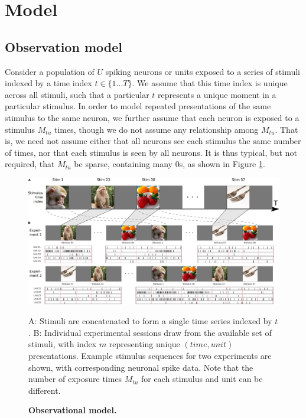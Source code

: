 \documentclass[12pt,a4paper]{article}
\begin{document}
\section*{Model}
\label{model_sec}

\subsection*{Observation model}
Consider a population of $U$ spiking neurons or units exposed to a series of stimuli indexed by a time index $t\in \lbrace 1\ldots T\rbrace$. We assume that this time index is unique across all stimuli, such that a particular $t$ represents a unique moment in a particular stimulus. In order to model repeated presentations of the same stimulus to the same neuron, we further assume that each neuron is exposed to a stimulus $M_{tu}$ times, though we do not assume any relationship among $M_{tu}$. That is, we need not assume either that all neurons see each stimulus the same number of times, nor that each stimulus is seen by all neurons. It is thus typical, but not required, that $M_{tu}$ be sparse, containing many 0s, as shown in Figure \ref{fig:movie}.

\begin{figure}[!ht]
    \includegraphics[width=\linewidth]{figures/stim_movie}
	\caption{\bf Observational model.}
    A: Stimuli are concatenated to form a single time series indexed by $t$. B: Individual experimental sessions draw from the available set of stimuli, with index $m$ representing unique $(time, unit)$ presentations. Example stimulus sequences for two experiments are shown, with corresponding neuronal spike data. Note that the number of exposure times $M_{tu}$ for each stimulus and unit can be different.
	\label{fig:movie}
\end{figure}
\end{document}
